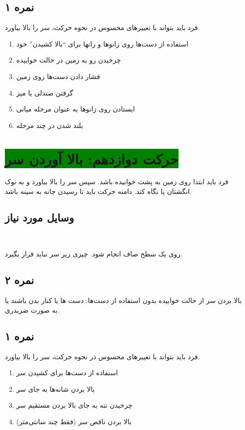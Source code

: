 \documentclass[12pt]{report}
\begin{document}
	\subsection*{نمره ۱}
	فرد باید بتواند با تغییر‌های محسوس در نحوه حرکت، سر را بالا بیاورد.
	\begin{enumerate}
		\item استفاده از دست‌ها روی زانوها و رانها برای “بالا کشیدن” خود
		\item چرخیدن رو به زمین در حالت خوابیده
		\item فشار دادن دست‌ها روی زمین
		\item گرفتن صندلی یا میز
		\item ایستادن روی زانوها به عنوان مرحله میانی
		\item بلند شدن در چند مرحله
	\end{enumerate}
	\newpage
	
	\section*{\colorbox{green}{حرکت دوازدهم: بالا آوردن سر}}
	فرد باید ابتدا روی زمین به پشت خوابیده باشد. سپس سر را بالا بیاورد و به نوک انگشتان پا نگاه کند. دامنه حرکت باید تا رسیدن چانه به سینه باشد.
	‍\subsection*{وسایل مورد نیاز}
	‍‍‍‍
	روی یک سطح صاف انجام شود. چیزی زیر سر نباید قرار بگیرد.
	\subsection*{نمره ۲}
	بالا بردن سر از حالت  خوابیده بدون استفاده از دست‌ها. دست ها یا کنار بدن باشند یا به صورت ضربدری.
	\subsection*{نمره ۱}
	فرد باید بتواند با تغییر‌های محسوس در نحوه حرکت، سر را بالا بیاورد.
	\begin{enumerate}
		\item استفاده از دست‌ها برای کشیدن سر
		\item بالا بردن شانه‌ها به جای سر
		\item چرخیدن تنه به جای بالا بردن مستقیم سر
		\item بالا بردن ناقص سر (فقط چند سانتی‌متر)
	\end{enumerate}
	\newpage
	
\end{document}
